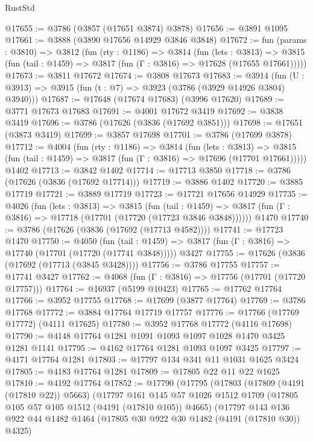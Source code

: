 \begin{lexlean}{RustStd}
\begin{coremodule}
@17655 := @3786 (@3857 (@17651 @3874) @3878)
@17656 := @3891 @1095
@17661 := @3888 (@3890 @17656 @14929 @3846 @3848)
@17672 := fun (params : @3810) =>
  @3812
    (fun (rty : @1186) =>
    @3814
      (fun (lets : @3813) =>
      @3815 (fun (tail : @1459) => @3817 (fun (Γ : @3816) => @17628 (@17655 @17661)))))
@17673 := @3811 @17672
@17674 := @3808 @17673
@17683 := @3914
    (fun (U : @3913) => @3915 (fun (t : @7) => @3923 (@3786 (@3929 @14926 @3804) @3940)))
@17687 := @17648 (@17674 @17683) (@3996 @17620)
@17689 := @3771 @17673 @17683
@17691 := @4001 @17672 @3419
@17692 := @3838 @3419
@17696 := @3786 (@17626 (@3836 (@17692 @3851)))
@17698 := @17651 (@3873 @3419)
@17699 := @3857 @17698
@17701 := @3786 (@17699 @3878)
@17712 := @4004
    (fun (rty : @1186) =>
    @3814
      (fun (lets : @3813) =>
      @3815 (fun (tail : @1459) => @3817 (fun (Γ : @3816) => @17696 (@17701 @17661)))))
    @1402
@17713 := @3842 @1402
@17714 := @17713 @3850
@17718 := @3786 (@17626 (@3836 (@17692 @17714)))
@17719 := @3886 @1402
@17720 := @3885 @17719
@17721 := @3889 @17719
@17723 := @17721 @17656 @14929
@17735 := @4026
    (fun (lets : @3813) =>
    @3815
      (fun (tail : @1459) =>
      @3817 (fun (Γ : @3816) => @17718 (@17701 (@17720 (@17723 @3846 @3848))))))
    @1470
@17740 := @3786 (@17626 (@3836 (@17692 (@17713 @4582))))
@17741 := @17723 @1470
@17750 := @4050
    (fun (tail : @1459) => @3817 (fun (Γ : @3816) => @17740 (@17701 (@17720 (@17741 @3848)))))
    @3427
@17755 := @17626 (@3836 (@17692 (@17713 (@3845 @3428))))
@17756 := @3786 @17755
@17757 := @17741 @3427
@17762 := @4068 (fun (Γ : @3816) => @17756 (@17701 (@17720 @17757)))
@17764 := @16937 (@5199 @10423)
@17765 := @17762 @17764
@17766 := @3952 @17755
@17768 := @17699 (@3877 @17764)
@17769 := @3786 @17768
@17772 := @3884 @17764 @17719 @17757
@17776 := @17766 (@17769 @17772) (@4111 @17625)
@17780 := @3952 @17768 @17772 (@4116 @17698)
@17790 := @4148 @17764 @1281 @1091 @1093 @1097 @1028 @1470 @3425 @1281 @1141
@17795 := @4162 @17764 @1281 @1093 @1097 @3425
@17797 := @4171 @17764 @1281
@17803 := @17797 @134 @341 @11 @1031 @1625 @3424
@17805 := @4183 @17764 @1281
@17809 := @17805 @22 @11 @22 @1625
@17810 := @4192 @17764
@17852 := @17790
    (@17795
      (@17803
        (@17809 (@4191 (@17810 @22)) @5663)
        (@17797
          @161
          @145
          @57
          @1026
          @1512
          @1709
          (@17805 @105 @57 @105 @1512 (@4191 (@17810 @105)) @4665)
          (@17797
            @143
            @136
            @922
            @44
            @1482
            @1464
            (@17805 @30 @922 @30 @1482 (@4191 (@17810 @30)) @4325)

\end{coremodule}
\end{lexlean}
